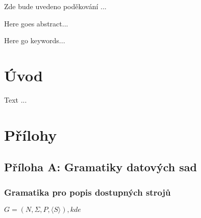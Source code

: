 \documentclass[draft]{fithesis}
\begin{document}
\FrontMatter
\ThesisTitlePage

\begin{ThesisDeclaration}
\DeclarationText
\AdvisorName
\end{ThesisDeclaration}

\begin{ThesisThanks}
Zde bude uvedeno poděkování ...
\end{ThesisThanks}

\begin{ThesisAbstract}
Here goes abstract...
\end{ThesisAbstract}

\begin{ThesisKeyWords}
Here go keywords...
\end{ThesisKeyWords}

\MainMatter
\tableofcontents
\chapter*{Úvod}
Text ...
\chapter*{Přílohy}

\section*{Příloha A: Gramatiky datových sad}

\subsection*{Gramatika pro popis dostupných strojů}

$G = (N, \Sigma, P,  \langle S  \rangle ), kde$
\end{document}
